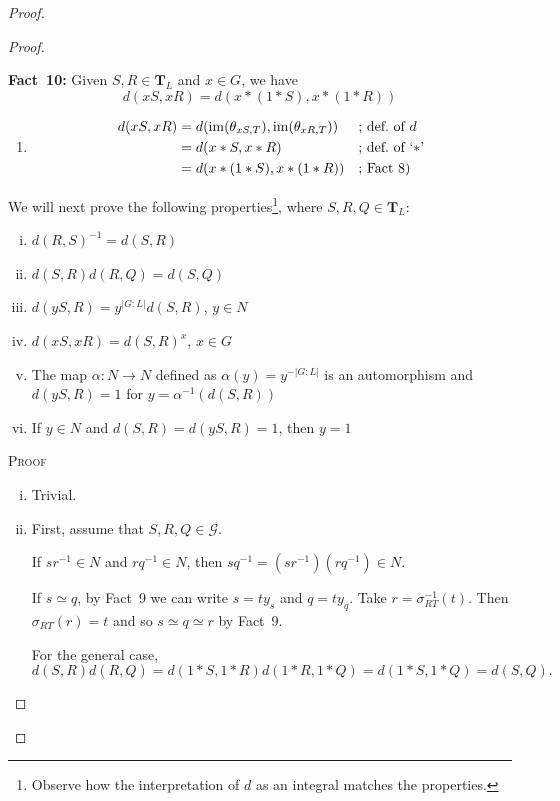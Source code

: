 \begin{proof}
\begin{proof}
\begin{enumerate}[a),font=\upshape]
    \textbf{Fact~10:} Given $S,R\in\mathbf T_L$ and $x\in G$, we have 
    $$
        d(xS,xR) = d(x\ast(1\ast S),x\ast(1\ast R))
    $$
    {\small
    \begin{enumerate}
        \item[$\to$]
        \begin{align*}
            d(xS,xR) &= d(\operatorname{im}(\theta_{xS,T}),\operatorname{im}(\theta_{xR,T}))
                    &&\text{; def.~of $d$}\\
                &= d(x\ast S,x\ast R)
                    &&\text{; def.~of `$\ast$'}\\
                &= d(x\ast(1\ast S),x\ast(1\ast R))
                    &&\text{; Fact 8)}
        \end{align*}
    \end{enumerate}
    }

    \medskip
    
    We will next prove the following properties\footnote{Observe how the interpretation of $d$ as an integral matches the properties.}, where $S,R,Q\in\mathbf T_L$:
    \begin{enumerate}[i)]
        \item $d(R,S)^{-1} = d(S,R)$
        \item $d(S,R)d(R,Q) = d(S,Q)$
        \item $d(yS,R) = y^{|G:L|}d(S,R)$, $y\in N$
        \item $d(xS,xR) = d(S,R)^x$, $x\in G$
        \item The map $\alpha\colon N\to N$ defined as $\alpha(y)=y^{-|G:L|}$ is an automorphism and $d(yS,R) = 1$ for $y = \alpha^{-1}(d(S,R))$
        \item If $y\in N$ and $d(S,R)=d(yS,R) = 1$, then $y = 1$
    \end{enumerate}
    {\small
    \textsc{Proof}
    \begin{enumerate}[i)]
        \item Trivial.

        \item First, assume that $S,R,Q\in\mathcal G$.
        
        If $sr^{-1}\in N$ and $rq^{-1}\in N$, then $sq^{-1}=(sr^{-1})(rq^{-1})\in N$.
            
        If $s\simeq q$, by Fact~9 we can write $s=ty_s$ and $q=ty_q$. Take $r=\sigma_{RT}^{-1}(t)$. Then $\sigma_{RT}(r)=t$ and so $s\simeq q\simeq r$ by Fact~9.

        For the general case,
        $$
            d(S,R)d(R,Q)=d(1\ast S,1\ast R)d(1\ast R,1\ast Q)
                = d(1\ast S,1\ast Q) = d(S,Q).
        $$


\end{enumerate}}
\end{enumerate}
\end{proof}
\end{proof}
